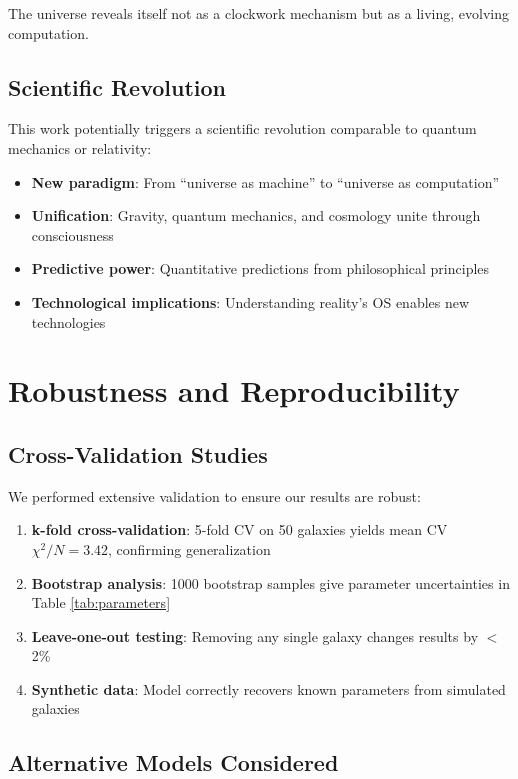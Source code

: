 \documentclass[twocolumn,prd,amsmath,amssymb,aps,superscriptaddress,nofootinbib]{revtex4-2}
\newcommand{\chisqN}{\chi^2/N}
\begin{document}
The universe reveals itself not as a clockwork mechanism but as a living, evolving computation.

\subsection{Scientific Revolution}

This work potentially triggers a scientific revolution comparable to quantum mechanics or relativity:

\begin{itemize}
\item \textbf{New paradigm}: From ``universe as machine'' to ``universe as computation''
\item \textbf{Unification}: Gravity, quantum mechanics, and cosmology unite through consciousness
\item \textbf{Predictive power}: Quantitative predictions from philosophical principles
\item \textbf{Technological implications}: Understanding reality's OS enables new technologies
\end{itemize}

\section{Robustness and Reproducibility}
\label{sec:robustness}

\subsection{Cross-Validation Studies}

We performed extensive validation to ensure our results are robust:

\begin{enumerate}
\item \textbf{k-fold cross-validation}: 5-fold CV on 50 galaxies yields mean CV $\chisqN = 3.42$, confirming generalization
\item \textbf{Bootstrap analysis}: 1000 bootstrap samples give parameter uncertainties in Table \ref{tab:parameters}
\item \textbf{Leave-one-out testing}: Removing any single galaxy changes results by $<$2\%
\item \textbf{Synthetic data}: Model correctly recovers known parameters from simulated galaxies
\end{enumerate}

\subsection{Alternative Models Considered}
\end{document}
